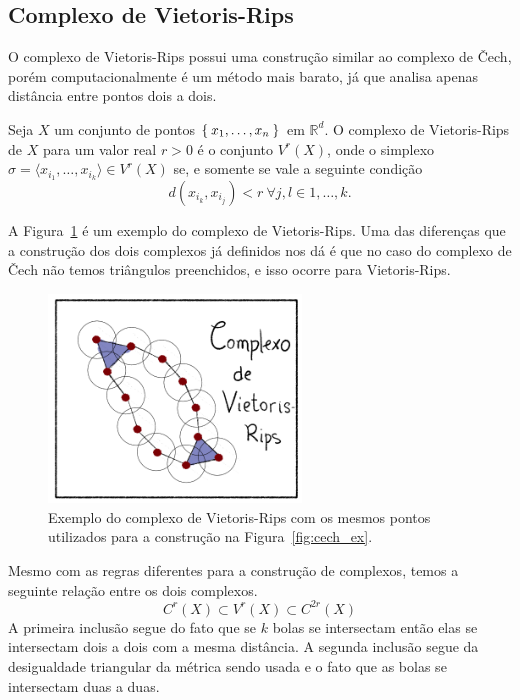\subsection{Complexo de Vietoris-Rips}
O complexo de Vietoris-Rips possui uma construção similar ao complexo de \v{C}ech,
porém computacionalmente é um método mais barato, já que analisa apenas distância
entre pontos dois a dois.
\begin{defi}
  Seja $X$ um conjunto de pontos $\Set{x_1, \dots, x_n}$ em $\mathbb{R}^d$. O complexo
  de Vietoris-Rips de $X$ para um valor real $r>0$ é o conjunto $V^r(X)$, onde o simplexo
  $\sigma = \langle x_{i_1}, \dots, x_{i_k} \rangle \in V^r(X)$ se, e somente se vale a seguinte
  condição
  \begin{equation*}
    d(x_{i_k}, x_{i_j}) < r \ \forall j,l \in{1,\dots,k}.
  \end{equation*}
\end{defi}
A Figura~\ref{fig:viet_ex} é um exemplo do complexo de Vietoris-Rips. Uma das diferenças
que a construção dos dois complexos já definidos nos dá é que no caso do complexo
de \v{C}ech não temos triângulos preenchidos, e isso ocorre para Vietoris-Rips.
\begin{figure}[!htpb]
  \centering
  \includegraphics[width=0.6\textwidth]{images/ComplexRips.png}
  \caption{Exemplo do complexo de Vietoris-Rips com os mesmos pontos utilizados
  para a construção na Figura~\ref{fig:cech_ex}.}
  \label{fig:viet_ex}
  \fautor
\end{figure}

Mesmo com as regras diferentes para a construção de complexos, temos a seguinte
relação entre os dois complexos.
\begin{equation}
  \label{eq:viet_cech}
  C^r(X) \subset V^r(X) \subset C^{2r}(X)
\end{equation}
A primeira inclusão segue do fato que se $k$ bolas se intersectam então elas se
intersectam dois a dois com a mesma distância. A segunda inclusão segue da
desigualdade triangular da métrica sendo usada e o fato que as bolas se
intersectam duas a duas.

